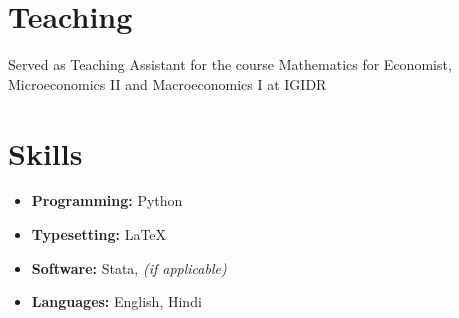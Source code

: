\documentclass[11pt,letterpaper]{article}
\begin{document}
\section*{Teaching}

Served as Teaching Assistant for the course Mathematics for Economist, Microeconomics II and Macroeconomics I at IGIDR

\section*{Skills}

\begin{itemize}[leftmargin=1.1em, itemsep=0.3em, topsep=0pt]
  \item \textbf{Programming:} Python
  \item \textbf{Typesetting:} LaTeX
  \item \textbf{Software:} Stata, \textit{(if applicable)}
  \item \textbf{Languages:} English, Hindi
\end{itemize}
\end{document}
